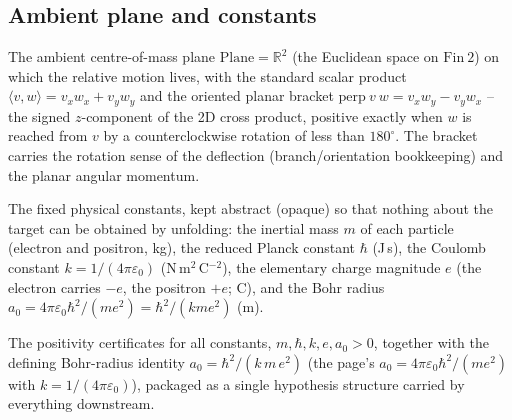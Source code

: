 \subsection*{Ambient plane and constants}

\begin{definition}
\label{def:IPhO2026Problems_problem_IPhO_2026_1_B_2:Plane}
The ambient centre-of-mass plane $\mathrm{Plane} = \mathbb{R}^2$ (the
Euclidean space on $\mathrm{Fin}\ 2$) on which the relative motion lives,
with the standard scalar product $\langle v, w\rangle = v_x w_x + v_y w_y$
and the oriented planar bracket $\mathrm{perp}\ v\ w = v_x w_y - v_y w_x$ --
the signed $z$-component of the 2D cross product, positive exactly when $w$
is reached from $v$ by a counterclockwise rotation of less than
$180^{\circ}$.  The bracket carries the rotation sense of the deflection
(branch/orientation bookkeeping) and the planar angular momentum.
\end{definition}

\begin{definition}
\label{def:IPhO2026Problems_problem_IPhO_2026_1_B_2:constants}
The fixed physical constants, kept abstract (opaque) so that nothing about
the target can be obtained by unfolding: the inertial mass $m$ of each
particle (electron and positron, kg), the reduced Planck constant $\hbar$
(J\,s), the Coulomb constant $k = 1/(4\pi\varepsilon_0)$
(N\,m$^2$\,C$^{-2}$), the elementary charge
magnitude $e$ (the electron carries $-e$, the positron $+e$; C), and the
Bohr radius $a_0 = 4\pi\varepsilon_0\hbar^2/(m e^2) = \hbar^2/(k m e^2)$
(m).
\end{definition}

\begin{definition}
\label{def:IPhO2026Problems_problem_IPhO_2026_1_B_2:ScalingRegime}
The positivity certificates for all constants, $m, \hbar, k, e, a_0 > 0$,
together with the defining Bohr-radius identity
$a_0 = \hbar^2/(k\,m\,e^2)$ (the page's
$a_0 = 4\pi\varepsilon_0\hbar^2/(m e^2)$ with $k = 1/(4\pi\varepsilon_0)$),
packaged as a single hypothesis structure carried by everything downstream.
\end{definition}


